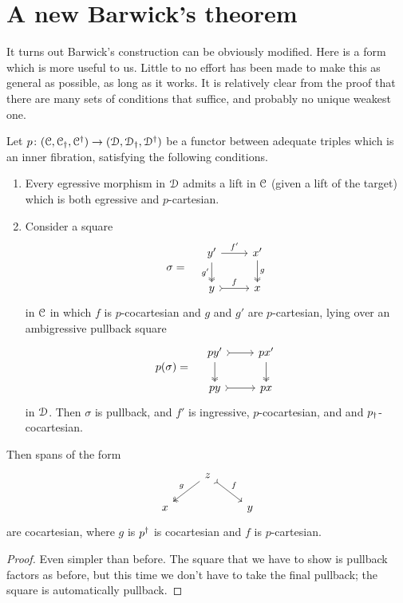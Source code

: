 \documentclass[main.tex]{subfiles}
\begin{document}
\section{A new Barwick's theorem}
\label{sec:a_new_barwick_s_theorem}

It turns out Barwick's construction can be obviously modified. Here is a form which is more useful to us. Little to no effort has been made to make this as general as possible, as long as it works. It is relatively clear from the proof that there are many sets of conditions that suffice, and probably no unique weakest one.

\begin{theorem}
  Let $p\colon (\mathcal{C}, \mathcal{C}_{\dagger}, \mathcal{C}^{\dagger}) \to (\mathcal{D}, \mathcal{D}_{\dagger}, \mathcal{D}^{\dagger})$ be a functor between adequate triples which is an inner fibration, satisfying the following conditions.
  \begin{enumerate}
    \item Every egressive morphism in $\mathcal{D}$ admits a lift in $\mathcal{C}$ (given a lift of the target) which is both egressive and $p$-cartesian.

    \item Consider a square
      \begin{equation*}
          \sigma = \quad
          \begin{tikzcd}
            y'
            \arrow[r, "f'"]
            \arrow[d, two heads, swap, "g'"]
            & x'
            \arrow[d, two heads, "g"]
            \\
            y
            \arrow[r, rightarrowtail, "f"]
            & x
          \end{tikzcd}
      \end{equation*}
      in $\mathcal{C}$ in which $f$ is $p$-cocartesian and $g$ and $g'$ are $p$-cartesian, lying over an ambigressive pullback square
      \begin{equation*}
        p(\sigma) = \quad
        \begin{tikzcd}
          py'
          \arrow[r, rightarrowtail]
          \arrow[d, two heads]
          & px'
          \arrow[d, two heads]
          \\
          py
          \arrow[r, rightarrowtail]
          & px
        \end{tikzcd}
      \end{equation*}
      in $\mathcal{D}$. Then $\sigma$ is pullback, and $f'$ is ingressive, $p$-cocartesian, and and $p_{\dagger}$-cocartesian.
  \end{enumerate}
  Then spans of the form
  \begin{equation*}
    \begin{tikzcd}
      & z
      \arrow[dl, two heads, swap, "g"]
      \arrow[dr, rightarrowtail, "f"]
      \\
      x
      && y
    \end{tikzcd}
  \end{equation*}
  are cocartesian, where $g$ is $p^{\dagger}$ is cocartesian and $f$ is $p$-cartesian.
\end{theorem}
\begin{proof}
  Even simpler than before. The square that we have to show is pullback factors as before, but this time we don't have to take the final pullback; the square is automatically pullback.
\end{proof}
\end{document}
